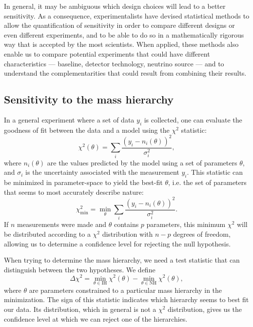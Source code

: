 In general, it may be ambiguous which design choices will lead to a better
sensitivity.  As a consequence, experimentalists have devised statistical
methods to allow the quantification of sensitivity in order to compare
different designs or even different experiments, and to be able to do so in a
mathematically rigorous way that is accepted by the most scientists.
When applied, these methods also enable us to compare potential experiments that
could have different characteristics --- baseline, detector technology,
neutrino source --- and to understand the complementarities that could result
from combining their results.



\subsection{Sensitivity to the mass hierarchy}
In a general experiment where a set of data $y_i$ is collected, one can
evaluate the goodness of fit between the data and a model using the
$\chi^2$ statistic:
\begin{equation}
	\chi^2(\theta) = \sum_i \frac{(y_i -
	n_i(\theta))^2}{\sigma^2_i},\label{eq:chisq}
\end{equation}
where $n_i(\theta)$ are the values predicted by the model using a set of parameters
$\theta$, and $\sigma_i$ is the uncertainty associated with the measurement $y_i$.
This statistic can be minimized in parameter-space to yield the best-fit
$\theta$, i.e. the set of parameters that seems to most accurately describe nature:
\begin{equation}\chi^2_\text{min} = \min_\theta \sum_i \frac{(y_i -
n_i(\theta))^2}{\sigma^2_i}.\label{eq:c2_min}\end{equation}
If $n$ measurements were made and $\theta$ contains $p$ parameters, this
minimum $\chi^2$ will be distributed according to a $\chi^2$ distribution with
$n-p$ degrees of freedom, allowing us to determine a confidence level for
rejecting the null hypothesis.

When trying to determine the mass hierarchy, we need a test statistic that can
distinguish between the two hypotheses. We define
\begin{equation}\Delta \chi^2 = \min_{\theta \in \text{IH}} \chi^2(\theta) - \min_{\theta \in
\text{NH}} \chi^2(\theta),\label{eq:dc2}\end{equation}
where $\theta$ are parameters constrained to a particular mass hierarchy in the
minimization. The sign of this statistic indicates which hierarchy seems to
best fit our data. Its distribution, which in general is not a $\chi^2$
distribution, gives us the confidence level at which we can reject one of the
hierarchies.

